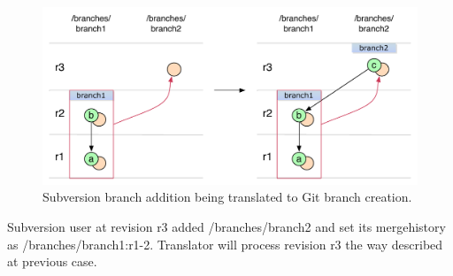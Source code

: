 \begin{enumerate}
\begin{figure}[!h]
\centering
\includegraphics[width=\linewidth]{img/diagrams/branch_creation_from_mergeinfo_svn_to_git.pdf}
\caption{Subversion branch addition being translated to Git branch creation.}
\label{svn_branch_creation_from_mergeinfo}
\end{figure}

Subversion user at revision r3 added /branches/branch2 and set its mergehistory as /branches/branch1:r1-2. Translator will process revision r3 the way described at previous case.
\end{enumerate}
